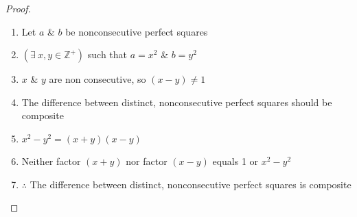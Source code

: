 \documentclass{article}
\begin{document}
\begin{proof}
    \begin{enumerate}
        \item Let $a$ \& $b$ be nonconsecutive perfect squares
        \item $(\exists \  x,y \in \mathbb{Z}^+)$ such that $a = x^2$ \& $b=y^2$
        \item $x$ \& $y$ are non consecutive, so $(x-y) \neq 1$
        \item The difference between distinct, nonconsecutive perfect squares should be composite
        \item $x^2 - y^2 = (x + y)(x - y)$
        \item Neither factor $(x + y)$ nor factor $(x - y)$ equals 1 or $x^2 - y^2$
        \item $\therefore$ The difference between distinct, nonconsecutive perfect squares is composite
    \end{enumerate}
\end{proof}

\bigskip
\end{document}
